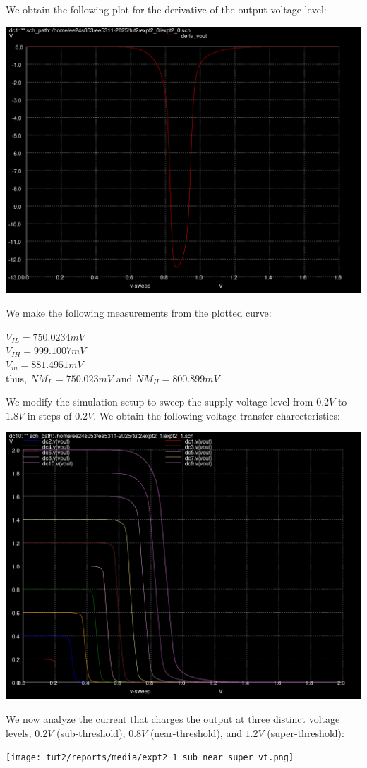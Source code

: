 \documentclass[10pt,a4paper]{article}
\begin{document}
\noindent We obtain the following plot for the derivative of the output voltage level:
\begin{center}
\includegraphics[scale=0.5]{tut2/reports/media/expt2_0_deriv_vout.png}
\end{center}

\noindent We make the following measurements from the plotted curve:

\begin{center}
    $V_{IL} = 750.0234 mV$ \\
    $V_{IH} = 999.1007 mV$ \\
    $V_m = 881.4951 mV$ \\
    thus, $NM_L = 750.023 mV$ and $NM_H = 800.899 mV$
\end{center}

\noindent We modify the simulation setup to sweep the supply voltage level from $0.2V$ to $1.8V$ in steps of $0.2V$. We obtain the following voltage transfer charecteristics:
\begin{center}
\includegraphics[scale=0.5]{tut2/reports/media/expt2_1_vtc.png}
\end{center}

\noindent We now analyze the current that charges the output at three distinct voltage levels; $0.2V$ (sub-threshold), $0.8V$ (near-threshold), and $1.2V$ (super-threshold):
\begin{center}
\texttt{[image: tut2/reports/media/expt2\_1\_sub\_near\_super\_vt.png]}
\end{center}
\end{document}
